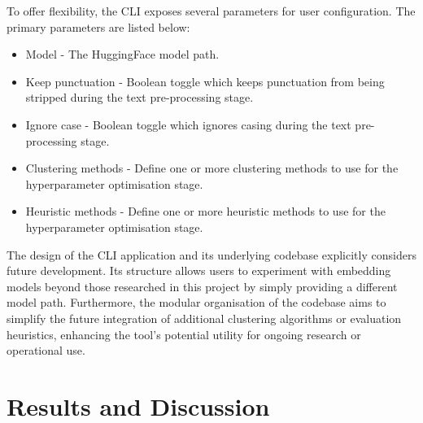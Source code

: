 \documentclass[10pt,oneside]{report}
\begin{document}
To offer flexibility, the CLI exposes several parameters for user configuration. The primary parameters are listed below:
\begin{itemize}
    \item Model - The HuggingFace model path.
    \item Keep punctuation - Boolean toggle which keeps punctuation from being stripped during the text pre-processing stage.
    \item Ignore case - Boolean toggle which ignores casing during the text pre-processing stage.
    \item Clustering methods - Define one or more clustering methods to use for the hyperparameter optimisation stage. 
    \item Heuristic methods - Define one or more heuristic methods to use for the hyperparameter optimisation stage.
\end{itemize}

The design of the CLI application and its underlying codebase explicitly considers future development. Its structure allows users to experiment with embedding models beyond those researched in this project by simply providing a different model path. Furthermore, the modular organisation of the codebase aims to simplify the future integration of additional clustering algorithms or evaluation heuristics, enhancing the tool's potential utility for ongoing research or operational use.

\chapter{Results and Discussion}\label{chap:results}


\end{document}
